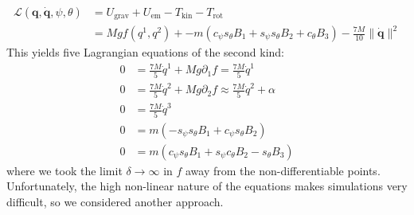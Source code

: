 \begin{equation}
    \begin{split}
        \mathcal{L}(\boldsymbol{q}, \dot{\boldsymbol{q}}, \psi, \theta) &= U_\text{grav} + U_\text{em} - T_\text{kin} - T_\text{rot} \\
                                                                        &= Mgf(q^1, q^2) + -m(c_\psi s_\theta B_1 + s_\psi s_\theta B_2 + c_\theta B_3) - \frac{7M}{10} \|\dot{\boldsymbol{q}}\|^2
\end{split}
\end{equation}
This yields five Lagrangian equations of the second kind:
\begin{align}
    0 &= \frac{7M}{5}\dot{q}^1 + Mg \partial_1 f = \frac{7M}{5} \dot{q}^1\\
    0 &= \frac{7M}{5}\dot{q}^2 + Mg \partial_2 f \approx \frac{7M}{5}\dot{q}^2 + \alpha\\
    0 &= \frac{7M}{5}\dot{q}^3\\
0 &= m(-s_\psi s_\theta B_1 + c_\psi s_\theta B_2)\\
    0 &= m(c_\psi s_\theta B_1 + s_\psi c_\theta B_2 - s_\theta B_3) 
\end{align}
where we took the limit $\delta \to \infty$ in $f$ away from the non-differentiable points.\\
Unfortunately, the high non-linear nature of the equations makes simulations very difficult, so we considered another approach.
